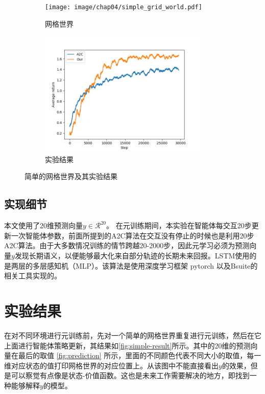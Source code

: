 \begin{figure}[h!] %
    \begin{subfigure}{0.48\textwidth}
        \centering
        \texttt{[image: image/chap04/simple\_grid\_world.pdf]}
        \caption{网格世界}
        \label{fig:simple-gridworld}
    \end{subfigure}
    \begin{subfigure}{0.48\textwidth}
        \centering
        \includegraphics[width=0.88\textwidth]{image/chap04/simple.png}
        \caption{实验结果}
        \label{fig:simple-result}
    \end{subfigure}
    \caption{简单的网格世界及其实验结果}
    \label{fig:simple}
\end{figure}


\subsection{实现细节}

本文使用了20维预测向量$y \in \mathcal{R}^{20}$。 在元训练期间，本实验在智能体每交互20步更新一次智能体参数，前面所提到的A2C算法在交互没有停止的时候也是利用20步A2C算法。由于大多数情况训练的情节跨越20-2000步，因此元学习必须为预测向量$y$发现长期语义，以便能够最大化来自部分轨迹的长期未来回报。LSTM使用的是两层的多层感知机（MLP）。该算法是使用深度学习框架 pytorch \cite{paszkePytorchImperativeStyle2019} 以及Bsuite的相关工具实现的。

\section{实验结果}
在对不同环境进行元训练前，先对一个简单的网格世界重复进行元训练，然后在它上面进行智能体策略更新，其结果如\autoref{fig:simple-result}所示。其中的20维的预测向量在最后的取值 \autoref{fig:prediction} 所示，里面的不同颜色代表不同大小的取值，每一维对应状态的值打印网格世界的对应位置上。从该图中不能直接看出$y$的效果，但是可以察觉有点像是状态-价值函数。这也是未来工作需要解决的地方，即找到一种能够解释$y$的模型。

